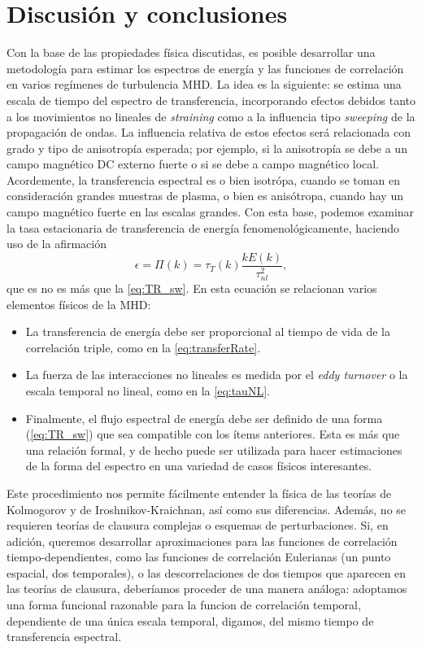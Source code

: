 

\section{Discusión y conclusiones}\label{sec:conclusiones}

Con la base de las propiedades física discutidas, es posible
desarrollar una metodología para estimar los espectros de energía y
las funciones de correlación en varios regímenes de turbulencia
MHD. La idea es la siguiente: se estima una escala de tiempo del
espectro de transferencia, incorporando efectos debidos tanto a los
movimientos no lineales de \textit{straining} como a la influencia
tipo \textit{sweeping} de la propagación de ondas. La influencia
relativa de estos efectos será relacionada con grado y tipo de
anisotropía esperada; por ejemplo, si la anisotropía se debe a un
campo magnético DC externo fuerte o si se debe a campo magnético
local. Acordemente, la transferencia espectral es o bien isotrópa,
cuando se toman en consideración grandes muestras de plasma, o bien es
anisótropa, cuando hay un campo magnético fuerte en las escalas
grandes. Con esta base, podemos examinar la tasa estacionaria de
transferencia de energía fenomenológicamente, haciendo uso de la
afirmación
\begin{equation}
  \epsilon = \Pi(k) = \tau_T(k) \frac{kE(k)}{\tau_{nl}^2},
\end{equation}
que es no es más que la \cref{eq:TR_sw}. En esta ecuación se
relacionan varios elementos físicos de la MHD:
\begin{itemize}
\item La transferencia de energía debe ser proporcional al tiempo de
  vida de la correlación triple, como en la \cref{eq:transferRate}.
\item La fuerza de las interacciones no lineales es medida por el
  \textit{eddy turnover} o la escala temporal no lineal, como en
  la \cref{eq:tauNL}.
\item Finalmente, el flujo espectral de energía debe ser definido de
  una forma (\cref{eq:TR_sw}) que sea compatible con los ítems
  anteriores. Esta es más que una relación formal, y de hecho puede
  ser utilizada para hacer estimaciones de la forma del espectro en
  una variedad de casos físicos interesantes.
\end{itemize}

Este procedimiento nos permite fácilmente entender la física de las
teorías de Kolmogorov y de Iroshnikov-Kraichnan, así como sus
diferencias. Además, no se requieren teorías de clausura complejas o
esquemas de perturbaciones. Si, en adición, queremos desarrollar
aproximaciones para las funciones de correlación tiempo-dependientes,
como las funciones de correlación Eulerianas (un punto espacial, dos
temporales), o las descorrelaciones de dos tiempos que aparecen en las
teorías de clausura, deberíamos proceder de una manera análoga:
adoptamos una forma funcional razonable para la funcion de correlación
temporal, dependiente de una única escala temporal, digamos,
del mismo tiempo de transferencia espectral.


